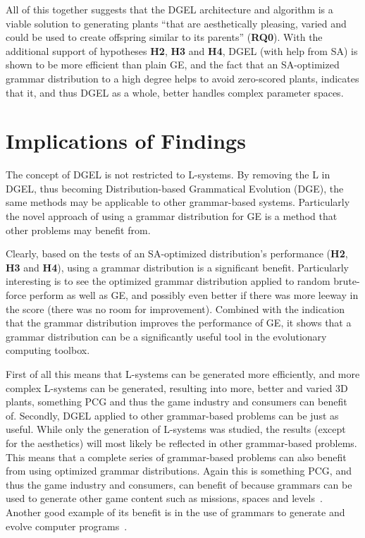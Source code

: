 All of this together suggests that the \gls{DGEL} architecture and algorithm is a viable solution to generating plants ``that are aesthetically pleasing, varied and could be used to create offspring similar to its parents'' (\textbf{RQ0}).
With the additional support of hypotheses \textbf{H2}, \textbf{H3} and \textbf{H4}, \gls{DGEL} (with help from \gls{SA}) is shown to be more efficient than plain \gls{GE}, and the fact that an \gls{SA}-optimized grammar distribution to a high degree helps to avoid zero-scored plants, indicates that it, and thus \gls{DGEL} as a whole, better handles complex parameter spaces.

\section{Implications of Findings}
The concept of \gls{DGEL} is not restricted to \glspl{L-system}.
By removing the L in \gls{DGEL}, thus becoming Distribution-based Grammatical Evolution (DGE), the same methods may be applicable to other grammar-based systems.
Particularly the novel approach of using a grammar distribution for \gls{GE} is a method that other problems may benefit from.

Clearly, based on the tests of an \gls{SA}-optimized distribution's performance (\textbf{H2}, \textbf{H3} and \textbf{H4}), using a grammar distribution is a significant benefit.
Particularly interesting is to see the optimized grammar distribution applied to random brute-force perform as well as \gls{GE}, and possibly even better if there was more leeway in the score (there was no room for improvement).
Combined with the indication that the grammar distribution improves the performance of \gls{GE}, it shows that a grammar distribution can be a significantly useful tool in the evolutionary computing toolbox.

First of all this means that \glspl{L-system} can be generated more efficiently, and more complex L-systems can be generated, resulting into more, better and varied 3D plants, something \gls{PCG} and thus the game industry and consumers can benefit of.
Secondly, \gls{DGEL} applied to other grammar-based problems can be just as useful.
While only the generation of \glspl{L-system} was studied, the results (except for the aesthetics) will most likely be reflected in other grammar-based problems.
This means that a complete series of grammar-based problems can also benefit from using optimized grammar distributions.
Again this is something \gls{PCG}, and thus the game industry and consumers, can benefit of because grammars can be used to generate other game content such as missions, spaces and levels~\cite{PCG_5}.
Another good example of its benefit is in the use of grammars to generate and evolve computer programs~\cite{1998Ryan}.

